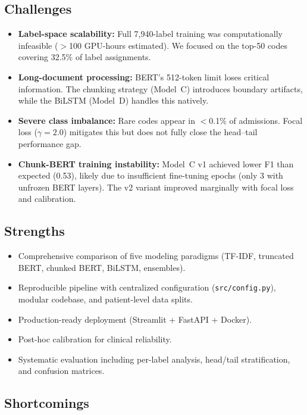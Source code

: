 \documentclass[11pt,a4paper]{article}
\begin{document}
\subsection{Challenges}

\begin{itemize}[nosep,leftmargin=1.5em]
    \item \textbf{Label-space scalability:} Full 7,940-label training was computationally infeasible ($>$100 GPU-hours estimated). We focused on the top-50 codes covering 32.5\% of label assignments.
    \item \textbf{Long-document processing:} BERT's 512-token limit loses critical information. The chunking strategy (Model~C) introduces boundary artifacts, while the BiLSTM (Model~D) handles this natively.
    \item \textbf{Severe class imbalance:} Rare codes appear in $<$0.1\% of admissions. Focal loss ($\gamma = 2.0$) mitigates this but does not fully close the head--tail performance gap.
    \item \textbf{Chunk-BERT training instability:} Model~C v1 achieved lower F1 than expected (0.53), likely due to insufficient fine-tuning epochs (only 3 with unfrozen BERT layers). The v2 variant improved marginally with focal loss and calibration.
\end{itemize}

\subsection{Strengths}

\begin{itemize}[nosep,leftmargin=1.5em]
    \item Comprehensive comparison of five modeling paradigms (TF-IDF, truncated BERT, chunked BERT, BiLSTM, ensembles).
    \item Reproducible pipeline with centralized configuration (\texttt{src/config.py}), modular codebase, and patient-level data splits.
    \item Production-ready deployment (Streamlit + FastAPI + Docker).
    \item Post-hoc calibration for clinical reliability.
    \item Systematic evaluation including per-label analysis, head/tail stratification, and confusion matrices.
\end{itemize}

\subsection{Shortcomings}
\end{document}

